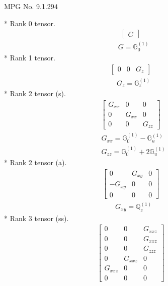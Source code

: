 \documentclass[fleqn,8pt,landscape]{jsarticle}
\begin{document}
\setcounter{MaxMatrixCols}{32}

\renewcommand{\tablename}{Table~}
\renewcommand{\figurename}{Figure~}
\begin{center}
\LARGE
MPG No. 9.1.29\quad$4$
\end{center}
* Rank 0 tensor.
\begin{align*}
\begin{bmatrix} G \end{bmatrix}
\end{align*}
\begin{align*}
& G = \mathbb{G}_{0}^{(1)}
\end{align*}
* Rank 1 tensor.
\begin{align*}
\begin{bmatrix} 0 & 0 & G_{z} \end{bmatrix}
\end{align*}
\begin{align*}
& G_{z} = \mathbb{G}_{z}^{(1)}
\end{align*}
* Rank 2 tensor (s).
\begin{align*}
\begin{bmatrix} G_{xx} & 0 & 0 \\ 0 & G_{xx} & 0 \\ 0 & 0 & G_{zz} \end{bmatrix}
\end{align*}
\begin{align*}
& G_{xx} = \mathbb{G}_{0}^{(1)} - \mathbb{G}_{u}^{(1)} \\
& G_{zz} = \mathbb{G}_{0}^{(1)} + 2 \mathbb{G}_{u}^{(1)}
\end{align*}
* Rank 2 tensor (a).
\begin{align*}
\begin{bmatrix} 0 & G_{xy} & 0 \\ - G_{xy} & 0 & 0 \\ 0 & 0 & 0 \end{bmatrix}
\end{align*}
\begin{align*}
& G_{xy} = \mathbb{Q}_{z}^{(1)}
\end{align*}
* Rank 3 tensor (ss).
\begin{align*}
\begin{bmatrix} 0 & 0 & G_{xxz} \\ 0 & 0 & G_{xxz} \\ 0 & 0 & G_{zzz} \\ 0 & G_{xxz} & 0 \\ G_{xxz} & 0 & 0 \\ 0 & 0 & 0 \end{bmatrix}
\end{align*}
\end{document}
